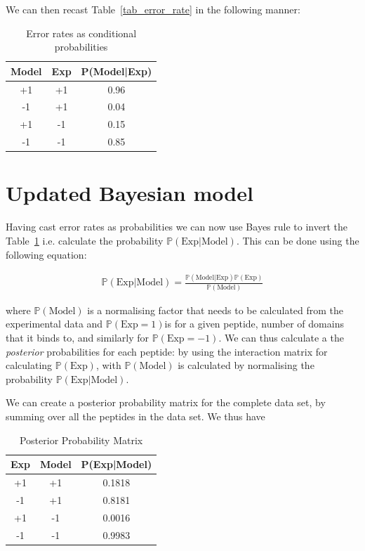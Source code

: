 \documentclass[a4paper, 12pt]{article}
\begin{document}
We can then recast Table~\ref{tab_error_rate} in the following manner:

\begin{table}[!h]
\centering
\caption{Error rates as conditional probabilities}
\label{tab_proba_error}
\begin{tabular}{@{}ccc@{}}
\toprule
Model & Exp & P(Model|Exp) \\ \midrule
+1    & +1  & 0.96         \\
-1    & +1  & 0.04         \\
+1    & -1  & 0.15         \\
-1    & -1  & 0.85         \\ \bottomrule
\end{tabular}
\end{table}

\section{Updated Bayesian model}

Having cast error rates as probabilities we can now use Bayes rule to invert the Table~\ref{tab_proba_error} i.e. calculate the probability $\mathbb{P}(\text{Exp|Model})$. This can be done using the following equation:

\begin{align}
\label{invert_proba_bayes}
\mathbb{P}(\text{Exp|Model}) = \frac{\mathbb{P}(\text{Model|Exp}) \mathbb{P}(\text{Exp})}{\mathbb{P}(\text{Model})}
\end{align}

where $\mathbb{P}(\text{Model})$ is a normalising factor that needs to be calculated from the experimental data and $\mathbb{P}(\text{Exp}=1)$is for a given peptide, number of domains that it binds to, and similarly for $\mathbb{P}(\text{Exp}=-1)$. We can thus calculate a the \textit{posterior} probabilities for each peptide: by using the interaction matrix for calculating $\mathbb{P}(\text{Exp})$, with $\mathbb{P}(\text{Model})$ is calculated by normalising the probability $\mathbb{P}(\text{Exp|Model})$. 

We can create a posterior probability matrix for the complete data set, by summing over all the peptides in the data set. We thus have

\begin{table}[!h]
\centering
\label{tab_proba_posterior}
\caption{Posterior Probability Matrix}
\begin{tabular}{@{}ccc@{}}
\toprule
Exp & Model & P(Exp|Model) \\ \midrule
+1  & +1    & 0.1818       \\
-1  & +1    & 0.8181       \\
+1  & -1    & 0.0016       \\
-1  & -1    & 0.9983       \\ \bottomrule

\end{tabular}
\end{table}
\end{document}

